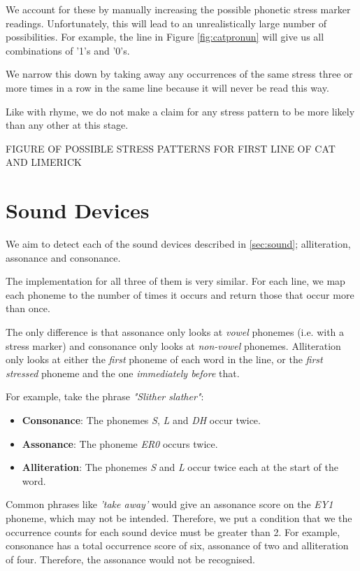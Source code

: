 We account for these by manually increasing the possible phonetic stress marker readings. Unfortunately, this will lead to an unrealistically large number of possibilities. For example, the line in Figure \ref{fig:catpronun} will give us all combinations of '1's and '0's. 

We narrow this down by taking away any occurrences of the same stress three or more times in a row in the same line because it will never be read this way.  

Like with rhyme, we do not make a claim for any stress pattern to be more likely than any other at this stage.

FIGURE OF POSSIBLE STRESS PATTERNS FOR FIRST LINE OF CAT AND LIMERICK


\section{Sound Devices}

We aim to detect each of the sound devices described in \ref{sec:sound}; alliteration, assonance and consonance.

The implementation for all three of them is very similar. For each line, we map each phoneme to the number of times it occurs and return those that occur more than once.

The only difference is that assonance only looks at \textit{vowel} phonemes (i.e. with a stress marker) and consonance only looks at \textit{non-vowel} phonemes. Alliteration only looks at either the \textit{first} phoneme of each word in the line, or the \textit{first stressed} phoneme and the one \textit{immediately before} that.

For example, take the phrase \textit{"Slither slather"}:
\begin{itemize}
\item{\textbf{Consonance}: The phonemes \textit{S}, \textit{L} and \textit{DH} occur twice.}
\item{\textbf{Assonance}: The phoneme \textit{ER0} occurs twice.}
\item{\textbf{Alliteration}: The phonemes \textit{S} and \textit{L} occur twice each at the start of the word.}
\end{itemize}

Common phrases like \textit{'take away'} would give an assonance score on the \textit{EY1} phoneme, which may not be intended. Therefore, we put a condition that we the occurrence counts for each sound device must be greater than 2. For example, consonance has a total occurrence score of six, assonance of two and alliteration of four. Therefore, the assonance would not be recognised.

